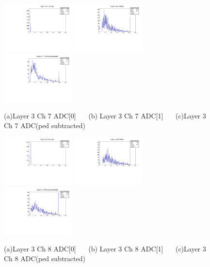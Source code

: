 \documentclass[a4paper,11pt]{article}
\theoremstyle{mytheor}
\begin{document}
\clearpage 
\begin{figure}[H] 
\vspace*{-0.3cm} 
\includegraphics[width=0.33\textwidth,scale=0.5,trim=0 0 0 0,clip]{plotsdir/file0_muons-Layer3_Ch7_adc0-1.pdf} 
\includegraphics[width=0.33\textwidth,scale=0.5,trim=0 0 0 0,clip]{plotsdir/file0_muons-Layer3_Ch7_adc1-1.pdf} 
\includegraphics[width=0.33\textwidth,scale=0.5,trim=0 0 0 0,clip]{plotsdir/file0_muons-Layer3_Ch7_adcPedsub-1.pdf} 
\caption{(a)Layer 3 Ch 7 ADC[0] ~~~(b) Layer 3 Ch 7 ADC[1] ~~~(c)Layer 3 Ch 7 ADC(ped subtracted) } 
\end{figure} 
\begin{figure}[H] 
\vspace*{-0.3cm} 
\includegraphics[width=0.33\textwidth,scale=0.5,trim=0 0 0 0,clip]{plotsdir/file0_muons-Layer3_Ch8_adc0-1.pdf} 
\includegraphics[width=0.33\textwidth,scale=0.5,trim=0 0 0 0,clip]{plotsdir/file0_muons-Layer3_Ch8_adc1-1.pdf} 
\includegraphics[width=0.33\textwidth,scale=0.5,trim=0 0 0 0,clip]{plotsdir/file0_muons-Layer3_Ch8_adcPedsub-1.pdf} 
\caption{(a)Layer 3 Ch 8 ADC[0] ~~~(b) Layer 3 Ch 8 ADC[1] ~~~(c)Layer 3 Ch 8 ADC(ped subtracted) } 
\end{figure} 
\end{document}
